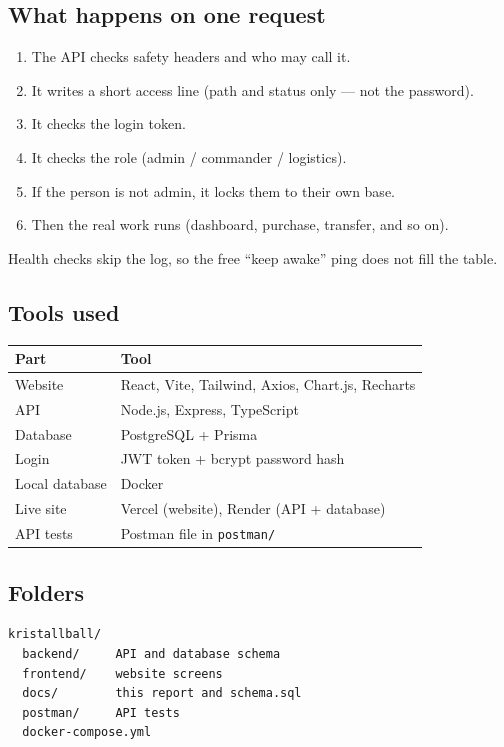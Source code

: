 \documentclass[11pt,a4paper]{article}
\begin{document}
\subsection{What happens on one request}

\begin{enumerate}
  \item The API checks safety headers and who may call it.
  \item It writes a short access line (path and status only --- not the password).
  \item It checks the login token.
  \item It checks the role (admin / commander / logistics).
  \item If the person is not admin, it locks them to their own base.
  \item Then the real work runs (dashboard, purchase, transfer, and so on).
\end{enumerate}

Health checks skip the log, so the free ``keep awake'' ping does not fill the table.

\subsection{Tools used}

\begin{center}
\begin{tabular}{ll}
\toprule
\textbf{Part} & \textbf{Tool} \\
\midrule
Website & React, Vite, Tailwind, Axios, Chart.js, Recharts \\
API & Node.js, Express, TypeScript \\
Database & PostgreSQL + Prisma \\
Login & JWT token + bcrypt password hash \\
Local database & Docker \\
Live site & Vercel (website), Render (API + database) \\
API tests & Postman file in \texttt{postman/} \\
\bottomrule
\end{tabular}
\end{center}

\subsection{Folders}

\begin{lstlisting}
kristallball/
  backend/     API and database schema
  frontend/    website screens
  docs/        this report and schema.sql
  postman/     API tests
  docker-compose.yml
\end{lstlisting}
\end{document}
